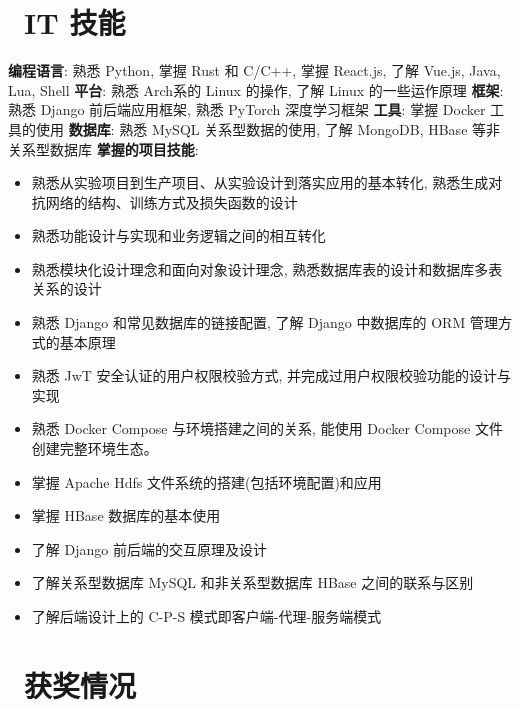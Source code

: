 \documentclass{resume}
\begin{document}
\section{\faCogs\ IT 技能}
\textbf{编程语言}: 熟悉 Python, 掌握 Rust 和 C/C++, 掌握 React.js, 了解 Vue.js, Java, Lua, Shell \newline
\textbf{平台}: 熟悉 Arch系的 Linux 的操作, 了解 Linux 的一些运作原理 \newline
\textbf{框架}: 熟悉 Django 前后端应用框架, 熟悉 PyTorch 深度学习框架 \newline
\textbf{工具}: 掌握 Docker 工具的使用 \newline
\textbf{数据库}: 熟悉 MySQL 关系型数据的使用, 了解 MongoDB, HBase 等非关系型数据库 \newline
\textbf{掌握的项目技能}: 
\begin{itemize}[parsep=0.5ex]
  \item 熟悉从实验项目到生产项目、从实验设计到落实应用的基本转化, 熟悉生成对抗网络的结构、训练方式及损失函数的设计
  \item 熟悉功能设计与实现和业务逻辑之间的相互转化
  \item 熟悉模块化设计理念和面向对象设计理念, 熟悉数据库表的设计和数据库多表关系的设计
  \item 熟悉 Django 和常见数据库的链接配置, 了解 Django 中数据库的 ORM 管理方式的基本原理
  \item 熟悉 JwT 安全认证的用户权限校验方式, 并完成过用户权限校验功能的设计与实现
  \item 熟悉 Docker Compose 与环境搭建之间的关系, 能使用 Docker Compose 文件创建完整环境生态。
  \item 掌握 Apache Hdfs 文件系统的搭建(包括环境配置)和应用
  \item 掌握 HBase 数据库的基本使用
  \item 了解 Django 前后端的交互原理及设计
  \item 了解关系型数据库 MySQL 和非关系型数据库 HBase 之间的联系与区别
  \item 了解后端设计上的 C-P-S 模式即客户端-代理-服务端模式
\end{itemize}

\section{\faHeartO\ 获奖情况}


%
%
\end{document}
